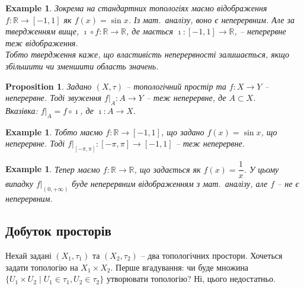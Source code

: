 \documentclass[a4paper, 10pt]{article}
\theoremstyle{theoremdd}
\newtheorem{example}[theorem]{Example}
\newtheorem{proposition}[theorem]{Proposition}
\begin{document}
\begin{example}
Зокрема на стандартних топологіях маємо відображення $f \colon \mathbb{R} \to [-1,1]$ як $f(x) = \sin x$. Із мат.\ аналізу, воно є неперервним. Але за твердженням вище, $\imath \circ f \colon \mathbb{R} \to \mathbb{R}$, де мається $\imath \colon [-1,1] \to \mathbb{R}$, -- неперервне теж відображення.\\
Тобто твердження каже, що властивість неперервності залишається, якщо збільшити чи зменшити область значень.
\end{example}

\begin{proposition}
Задано $(X,\tau)$ -- топологічний простір та $f \colon X \to Y$ -- неперервне. Тоді звуження $f \Big|_A \colon A \to Y$ -- теж неперервне, де $A \subset X$.\\
\textit{Вказівка: $f \Big|_A = f \circ \imath$, де $\imath \colon A \to X$.}
\end{proposition}

\begin{example}
Тобто маємо $f \colon \mathbb{R} \to [-1,1]$, що задано $f(x) = \sin x$, що неперервне. Тоді $f \Big|_{[-\pi,\pi]} \colon [-\pi,\pi] \to [-1,1]$ -- теж неперервне.
\end{example}

\begin{example}
Тепер маємо $f \colon \mathbb{R} \to \mathbb{R}$, що задається як $f(x) = \dfrac{1}{x}$. У цьому випадку $f \Big|_{(0,+\infty)}$ буде неперервним відображенням з мат.\ аналізу, але $f$ -- не є неперервним.
\end{example}

\subsection{Добуток просторів}
Нехай задані $(X_1,\tau_1)$ та $(X_2,\tau_2)$ -- два топологічних простори. Хочеться задати топологію на $X_1 \times X_2$. Перше вгадування: чи буде множина $\{U_1 \times U_2 \mid U_1 \in \tau_1, U_2 \in \tau_2\}$ утворювати топологію? Ні, цього недостатньо.
\end{document}
